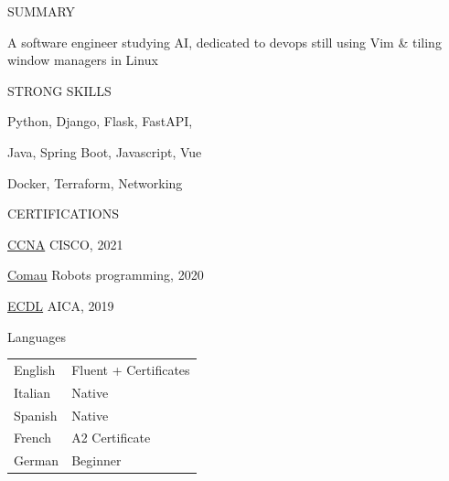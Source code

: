 \documentclass{cv} %
\begin{document}
\begin{minipage}[b][0.9\paperheight][t]{0.29\linewidth}

\begin{minipage}[c]{\linewidth}
    \centering
\end{minipage}

\begin{rSection}{SUMMARY}
    \item A software engineer studying AI, dedicated to devops
        still using Vim \& tiling window managers in Linux
\end{rSection}

\begin{rSection}{STRONG SKILLS}
    \item Python, Django, Flask, FastAPI,  
    \item Java, Spring Boot, Javascript, Vue
    \item Docker, Terraform, Networking
\end{rSection}

\begin{rSection}{CERTIFICATIONS}
    \item \underline{CCNA} {CISCO, 2021}
    \item \underline{Comau} {Robots programming, 2020}
    \item \underline{ECDL} {AICA, 2019}
\end{rSection}

\begin{rSection}{Languages}
    \vspace{0.2cm}
    \item \begin{tabular}{@{}ll@{}}
        English & Fluent + Certificates     \\
        Italian & Native                    \\
        Spanish & Native                    \\
        French  & A2 Certificate            \\
        German  & Beginner                  \\
    \end{tabular}
\end{rSection}


\end{minipage}
\end{document}
